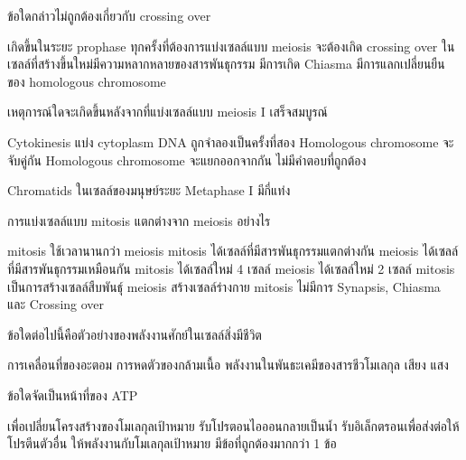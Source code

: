 \documentclass[12pt, a4paper]{exam}
\begin{document}
\begin{questions}
\filbreak
  \question ข้อใดกล่าวไม่ถูกต้องเกี่ยวกับ crossing over
  \begin{choices}
    \choice เกิดขึ้นในระยะ prophase
    \choice ทุกครั้งที่ต้องการแบ่งเซลล์แบบ meiosis จะต้องเกิด crossing over
    \choice ในเซลล์ที่สร้างขึ้นใหม่มีความหลากหลายของสารพันธุกรรม
    \choice มีการเกิด Chiasma
    \choice มีการแลกเปลี่ยนยืนของ homologous chromosome
\end{choices}

\newpage


\filbreak
  \question เหตุการณ์ใดจะเกิดขึ้นหลังจากที่แบ่งเซลล์แบบ meiosis I เสร็จสมบูรณ์
  \begin{choices}
    \choice Cytokinesis แบ่ง cytoplasm
    \choice DNA ถูกจำลองเป็นครั้งที่สอง
    \choice Homologous chromosome จะจับคู่กัน
    \choice Homologous chromosome จะแยกออกจากกัน
    \choice ไม่มีคำตอบที่ถูกต้อง
\end{choices}

\filbreak
  \question Chromatids ในเซลล์ของมนุษย์ระยะ Metaphase I มีกี่แท่ง
  \begin{choices}
\end{choices}

\filbreak
  \question การแบ่งเซลล์แบบ mitosis แตกต่างจาก meiosis อย่างไร
  \begin{choices}
    \choice mitosis ใช้เวลานานกว่า meiosis
    \choice mitosis ได้เซลล์ที่มีสารพันธุกรรมแตกต่างกัน meiosis ได้เซลล์ที่มีสารพันธุกรรมเหมือนกัน
    \choice mitosis ได้เซลล์ใหม่ 4 เซลล์ meiosis ได้เซลล์ใหม่ 2 เซลล์
    \choice mitosis เป็นการสร้างเซลล์สืบพันธุ์ meiosis สร้างเซลล์ร่างกาย
    \choice mitosis ไม่มีการ Synapsis, Chiasma และ Crossing over
\end{choices}

\filbreak
  \question ข้อใดต่อไปนี้คือตัวอย่างของพลังงานศักย์ในเซลล์สิ่งมีชีวิต
  \begin{choices}
    \choice การเคลื่อนที่ของอะตอม
    \choice การหดตัวของกล้ามเนื้อ
    \choice พลังงานในพันธะเคมีของสารชีวโมเลกุล
    \choice เสียง
    \choice แสง
\end{choices}

\filbreak
  \question ข้อใดจัดเป็นหน้าที่ของ ATP
  \begin{choices}
    \choice เพื่อเปลี่ยนโครงสร้างของโมเลกุลเป้าหมาย
    \choice รับโปรตอนไอออนกลายเป็นน้ำ
    \choice รับอิเล็กตรอนเพื่อส่งต่อให้โปรตีนตัวอื่น
    \choice ให้พลังงานกับโมเลกุลเป้าหมาย
    \choice มีข้อที่ถูกต้องมากกว่า 1 ข้อ
\end{choices}


\end{questions}
\end{document}
